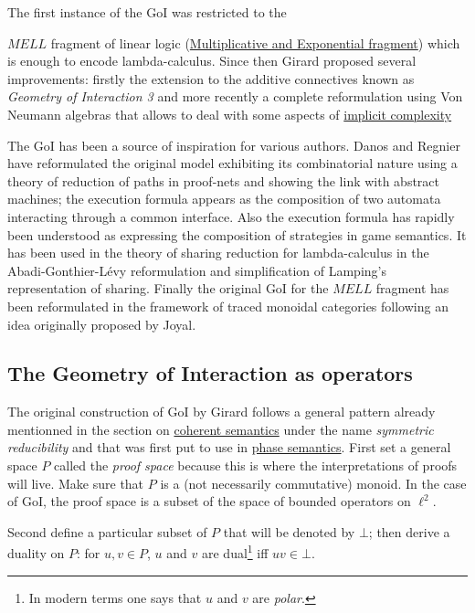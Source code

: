 The first instance of the GoI was restricted to the {\(MELL\) fragment of
linear logic (\hyperref[exponential-fragments]{Multiplicative and Exponential fragment}) which is enough
to encode lambda-calculus. Since then Girard proposed several
improvements: firstly the extension to the additive connectives known as
\emph{Geometry of Interaction 3} and more recently a complete
reformulation using Von Neumann algebras that allows to deal with some
aspects of \hyperref[light-linear-logics]{implicit complexity}

The GoI has been a source of inspiration for various authors. Danos and
Regnier have reformulated the original model exhibiting its
combinatorial nature using a theory of reduction of paths in proof-nets
and showing the link with abstract machines; the execution formula
appears as the composition of two automata interacting through a common
interface. Also the execution formula has rapidly been understood as
expressing the composition of strategies in game semantics. It has been
used in the theory of sharing reduction for lambda-calculus in the
Abadi-Gonthier-Lévy reformulation and simplification of Lamping's
representation of sharing. Finally the original GoI for the \(MELL\)
fragment has been reformulated in the framework of traced monoidal
categories following an idea originally proposed by Joyal.


\subsection{The Geometry of Interaction as operators}\label{the-geometry-of-interaction-as-operators}

The original construction of GoI by Girard follows a general pattern
already mentionned in the section on \hyperref[coherent-semantics]{coherent
semantics} under the name \emph{symmetric reducibility} and that was
first put to use in \hyperref[phase-semantics]{phase semantics}. First set a
general space \(P\) called the \emph{proof space} because this is where
the interpretations of proofs will live. Make sure that \(P\) is a (not
necessarily commutative) monoid. In the case of GoI, the proof space is
a subset of the space of bounded operators on \(\ell^2\).

Second define a particular subset of \(P\) that will be denoted by
\(\bot\); then derive a duality on \(P\): for \(u,v\in P\), \(u\) and
\(v\) are dual\footnote{In modern terms one says that \(u\) and \(v\)
  are \emph{polar}.} iff \(uv\in\bot\).

}
